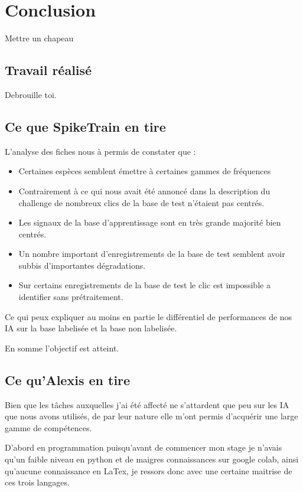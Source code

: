 \hypertarget{conclusion}{%
\chapter{Conclusion}\label{conclusion}}

Mettre un chapeau

\section{Travail réalisé}

Debrouille toi.

\section{Ce que SpikeTrain en tire}

L'analyse des fiches nous à permis de constater que :
\begin{itemize}
\item Certaines espèces semblent émettre à certaines gammes de fréquences
\item Contrairement à ce qui nous avait été annoncé dans la description du challenge de nombreux clics de la base de test n'étaient pas centrés.
\item Les signaux de la base d'apprentissage sont en très grande majorité bien centrés.
\item Un nombre important d'enregistrements de la base de test semblent avoir subbis d'importantes dégradations.
\item Sur certains enregistrements de la base de test le clic est impossible a identifier sans prétraitement.
\end{itemize}
Ce qui peux expliquer au moins en partie le différentiel de performances de nos IA sur la base labelisée et la base non labelisée.

En somme l'objectif est atteint.

\section{Ce qu'Alexis en tire}

Bien que les tâches auxquelles j'ai été affecté ne s'attardent que peu sur les
IA que nous avons utilisés, de par leur nature elle m'ont permis d'acquérir une
large gamme de compétences.

D'abord en programmation puisqu'avant de commencer mon stage je n'avais qu'un faible niveau en python et de maigres connaissances sur google colab, ainsi qu'aucune connaissance en LaTex, je ressors donc avec une certaine maitrise de ces trois langages.

